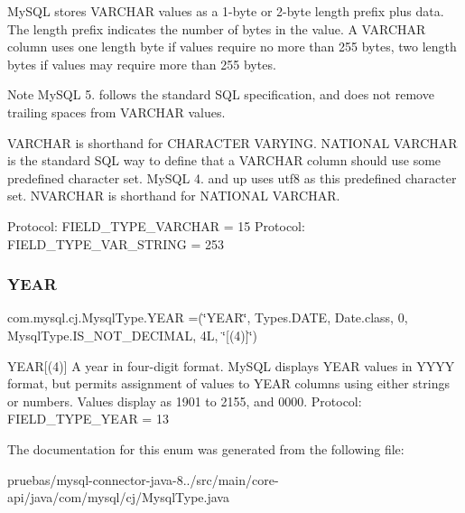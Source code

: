 My\+S\+QL stores V\+A\+R\+C\+H\+AR values as a 1-\/byte or 2-\/byte length prefix plus data. The length prefix indicates the number of bytes in the value. A V\+A\+R\+C\+H\+AR column uses one length byte if values require no more than 255 bytes, two length bytes if values may require more than 255 bytes.

Note My\+S\+QL 5. follows the standard S\+QL specification, and does not remove trailing spaces from V\+A\+R\+C\+H\+AR values.

V\+A\+R\+C\+H\+AR is shorthand for C\+H\+A\+R\+A\+C\+T\+ER V\+A\+R\+Y\+I\+NG. N\+A\+T\+I\+O\+N\+AL V\+A\+R\+C\+H\+AR is the standard S\+QL way to define that a V\+A\+R\+C\+H\+AR column should use some predefined character set. My\+S\+QL 4. and up uses utf8 as this predefined character set. N\+V\+A\+R\+C\+H\+AR is shorthand for N\+A\+T\+I\+O\+N\+AL V\+A\+R\+C\+H\+AR.

Protocol\+: F\+I\+E\+L\+D\+\_\+\+T\+Y\+P\+E\+\_\+\+V\+A\+R\+C\+H\+AR = 15 Protocol\+: F\+I\+E\+L\+D\+\_\+\+T\+Y\+P\+E\+\_\+\+V\+A\+R\+\_\+\+S\+T\+R\+I\+NG = 253 \mbox{\label{enumcom_1_1mysql_1_1cj_1_1_mysql_type_a58de6bd3431bd81f859926ed489f19c1}} 
\subsubsection{\texorpdfstring{Y\+E\+AR}{YEAR}}
{\footnotesize\ttfamily com.\+mysql.\+cj.\+Mysql\+Type.\+Y\+E\+AR =(\char`\"{}Y\+E\+AR\char`\"{}, Types.\+D\+A\+TE, Date.\+class, 0, Mysql\+Type.\+I\+S\+\_\+\+N\+O\+T\+\_\+\+D\+E\+C\+I\+M\+AL, 4\+L, \char`\"{}\mbox{[}(4)\mbox{]}\char`\"{})}

Y\+E\+AR\mbox{[}(4)\mbox{]} A year in four-\/digit format. My\+S\+QL displays Y\+E\+AR values in Y\+Y\+YY format, but permits assignment of values to Y\+E\+AR columns using either strings or numbers. Values display as 1901 to 2155, and 0000. Protocol\+: F\+I\+E\+L\+D\+\_\+\+T\+Y\+P\+E\+\_\+\+Y\+E\+AR = 13 

The documentation for this enum was generated from the following file\+:\begin{DoxyCompactItemize}
\item 
pruebas/mysql-\/connector-\/java-\/8../src/main/core-\/api/java/com/mysql/cj/Mysql\+Type.\+java\end{DoxyCompactItemize}
